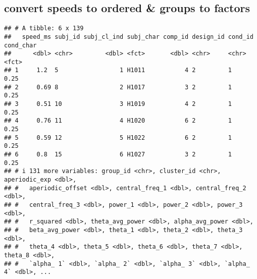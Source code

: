 \documentclass[
]{article}
\newenvironment{Shaded}{\begin{snugshade}}{\end{snugshade}}
\newcommand{\AttributeTok}[1]{\textcolor[rgb]{0.13,0.29,0.53}{#1}}
\newcommand{\ConstantTok}[1]{\textcolor[rgb]{0.56,0.35,0.01}{#1}}
\newcommand{\DecValTok}[1]{\textcolor[rgb]{0.00,0.00,0.81}{#1}}
\newcommand{\FunctionTok}[1]{\textcolor[rgb]{0.13,0.29,0.53}{\textbf{#1}}}
\newcommand{\NormalTok}[1]{#1}
\newcommand{\OtherTok}[1]{\textcolor[rgb]{0.56,0.35,0.01}{#1}}
\newcommand{\SpecialCharTok}[1]{\textcolor[rgb]{0.81,0.36,0.00}{\textbf{#1}}}
\newcommand{\StringTok}[1]{\textcolor[rgb]{0.31,0.60,0.02}{#1}}
\begin{document}
\hypertarget{convert-speeds-to-ordered-groups-to-factors}{%
\subsection{convert speeds to ordered \& groups to
factors}\label{convert-speeds-to-ordered-groups-to-factors}}

\begin{Shaded}
\end{Shaded}

\begin{verbatim}
## # A tibble: 6 x 139
##   speed_ms subj_id subj_cl_ind subj_char comp_id design_id cond_id cond_char
##      <dbl> <chr>         <dbl> <fct>       <dbl> <chr>     <chr>   <fct>    
## 1     1.2  5                 1 H1011           4 2         1       0.25     
## 2     0.69 8                 2 H1017           3 2         1       0.25     
## 3     0.51 10                3 H1019           4 2         1       0.25     
## 4     0.76 11                4 H1020           6 2         1       0.25     
## 5     0.59 12                5 H1022           6 2         1       0.25     
## 6     0.8  15                6 H1027           3 2         1       0.25     
## # i 131 more variables: group_id <chr>, cluster_id <chr>, aperiodic_exp <dbl>,
## #   aperiodic_offset <dbl>, central_freq_1 <dbl>, central_freq_2 <dbl>,
## #   central_freq_3 <dbl>, power_1 <dbl>, power_2 <dbl>, power_3 <dbl>,
## #   r_squared <dbl>, theta_avg_power <dbl>, alpha_avg_power <dbl>,
## #   beta_avg_power <dbl>, theta_1 <dbl>, theta_2 <dbl>, theta_3 <dbl>,
## #   theta_4 <dbl>, theta_5 <dbl>, theta_6 <dbl>, theta_7 <dbl>, theta_8 <dbl>,
## #   `alpha_ 1` <dbl>, `alpha_ 2` <dbl>, `alpha_ 3` <dbl>, `alpha_ 4` <dbl>, ...
\end{verbatim}
\end{document}
